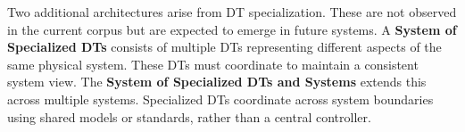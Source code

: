 Two additional architectures arise from DT specialization. These are not observed in the current corpus but are expected to emerge in future systems. A \textbf{System of Specialized DTs} consists of multiple DTs representing different aspects of the same physical system. These DTs must coordinate to maintain a consistent system view. The \textbf{System of Specialized DTs and Systems} extends this across multiple systems. Specialized DTs coordinate across system boundaries using shared models or standards, rather than a central controller.





